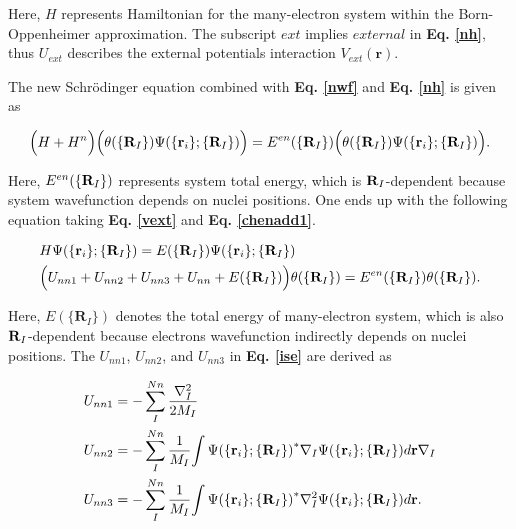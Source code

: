 \documentclass[a4paper, 12pt, titlepage,oneside,drop]{kthesis}
\begin{document}
Here, $H$ represents Hamiltonian for the many-electron system within the Born-Oppenheimer approximation. The subscript $ext$ implies $external$ in \textbf{Eq. \ref{nh}}, thus $U_{ext}$ describes
the external potentials interaction $V_{ext}({\textbf{r}})$. 

The new Schrödinger equation combined with \textbf{Eq. \ref{nwf}} and \textbf{Eq. \ref{nh}} is given as

\begin{equation}\label{chenadd1}
 \Big( H+ {H}^n \Big) \Big({\theta(\{{\textbf R}_{I}\})} {\Psi(\{\textbf{r}_{i}\}; \{{\textbf R}_{I}\})} \Big) =
 E^{en}(\{{\textbf R_I}\}) \Big({\theta(\{{\textbf R}_{I}\})} {\Psi(\{\textbf{r}_{i}\}; \{{\textbf R}_{I}\})}\Big).
\end{equation}
 
\noindent Here, $E^{en}(\{{\textbf R }_I\})$ represents system total energy, which is ${\textbf R}_I$-dependent because system wavefunction depends on nuclei positions. 
One ends up with the following equation taking \textbf{Eq. \ref{vext}} and \textbf{Eq. \ref{chenadd1}}.

\begin{equation}\begin{split}\label{ise}
& {H} {\Psi(\{\textbf{r}_{ i}\}; \{{\textbf R}_{ I}\})} = E{(\{\textbf{R}_{ I}\})} {\Psi(\{\textbf{r}_{i}\}; \{{\textbf R}_{I}\})} \\
& \Big( {U}_{nn1}+{U}_{nn2}+{U}_{nn3}+{U}_{nn}+E(\{{\textbf R}_{I}\}) \Big) {\theta(\{\textbf{R}_{I}\})} = E^{en}(\{{\textbf R}_I\}) {\theta(\{\textbf{R}_{I}\})}.
\end{split}
\end{equation}

\noindent Here, $E{(\{\textbf{R}_{I}\})}$ denotes the total energy of many-electron system, which is also ${\textbf R}_I$-dependent because electrons wavefunction indirectly depends on nuclei positions. The ${U}_{nn1}$,
${U}_{nn2}$, and ${U}_{nn3}$ in \textbf{Eq. \ref{ise}} are derived as

\begin{equation}\begin{split}
 &  {U}_{nn1} = - \sum\limits_I^{{Nn}} \frac{{{\nabla}_{{I}}^{2}}}{2 M_{I}}   \\
 &  {U}_{nn2} = - \sum\limits_I^{{Nn}} \frac{1}{M_{I}} {\int {\Psi(\{\textbf{r}_{{i}}\}; \{\textbf{R}_{I}\})}^{\ast} {{\nabla}_{{I}}} {{\Psi(\{\textbf{r}_{{i}} \}; \{\textbf{R}_{I}\})}} d {\textbf r }} {{\nabla}_{{I}}}  \\
 &  {U}_{nn3} = - \sum\limits_I^{{Nn}} \frac{1}{M_{I}} {\int {{\Psi(\{\textbf{r}_{{i}}\}; \{\textbf{R}_{I}\})}}^{\ast} {{\nabla}_{{I}}^{2}} {{\Psi(\{\textbf{r}_{{i}} \}; \{\textbf{R}_{I}\})}} d {\textbf r }}. 
\end{split}\end{equation}
\end{document}
